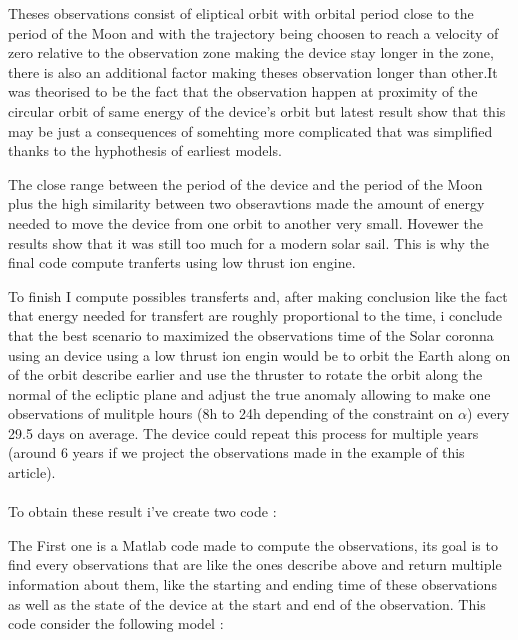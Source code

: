 \documentclass[11pt]{article} %
\begin{document}
			 Theses observations consist of eliptical orbit with orbital period close to the period of the Moon and with the trajectory being choosen to reach a velocity of zero relative to the observation zone making the device stay longer in the zone, there is also an additional factor making theses observation longer than other.It was theorised to be the fact that the observation happen at proximity of the circular orbit of same energy of the device's orbit but latest result show that this may be just a consequences of somehting more complicated that was simplified thanks to the hyphothesis of earliest models.
			 
			 The close range between the period of the device and the period of the Moon plus the high similarity between two obseravtions made the amount of energy needed to move the device from one orbit to another very small. Hovewer the results show that it was still too much for a modern solar sail. This is why the final code compute tranferts using low thrust ion engine.
			 
			 To finish I compute possibles transferts and, after making conclusion like the fact that energy needed for transfert are roughly proportional to the time, i conclude that the best scenario to maximized the observations time of the Solar coronna using an device using a low thrust ion engin would be to orbit the Earth along on of the orbit describe earlier and use the thruster to rotate the orbit along the normal of the ecliptic plane and adjust the true anomaly allowing to make one observations of mulitple hours (8h to 24h depending of the constraint on $\alpha$) every 29.5 days on average. The device could repeat this process for multiple years (around 6 years if we project the observations made in the example of this article). 
			 \\ \\
			 To obtain these result i've create two code :
			 
			 The First one is a Matlab code made to compute the observations, its goal is to find every observations that are like the ones describe above and return multiple information about them, like the starting and ending time of these observations as well as the state of the device at the start and end of the observation.
			 This code consider the following model : 
			 
\end{document}
